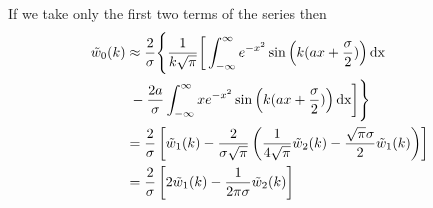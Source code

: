 \documentclass[letterpaper,twocolumn,amsmath,amssymb,prb]{revtex4-1}
\newcommand{\red}[1]{{\color{red} #1}}
\newcommand{\fixme}[1]{\red{[#1]}}
\begin{document}
If we take only the first two terms of the series then
\begin{align}
  \tilde{w}_0(k) &\approx \frac{2}{\sigma}\Bigg{\{}\frac{1}{k\sqrt{\pi}}
  \bigg[\int_{-\infty}^{\infty}
    e^{-x^2}\sin\left(k(ax+\frac{\sigma}{2})\right) \textrm{dx}\notag \\
    &\; -\frac{2a}{\sigma}\int_{-\infty}^{\infty} x e^{-x^2}
    \sin\left(k(ax+\frac{\sigma}{2})\right) \textrm{dx}\bigg]\Bigg{\}} \\
  &=\frac{2}{\sigma}\left[\tilde{w}_1(k) - \frac{2}{\sigma\sqrt{\pi}} \left(
    \frac{1}{4\sqrt{\pi}}\tilde{w}_2(k) - \frac{\sqrt{\pi} \sigma}{2}
    \tilde{w}_1(k)\right)\right] \\
  &= \frac{2}{\sigma} \left[2\tilde{w}_1(k) - \frac{1}{2 \pi
      \sigma}\tilde{w}_2(k) \right]
\end{align}
\end{document}
